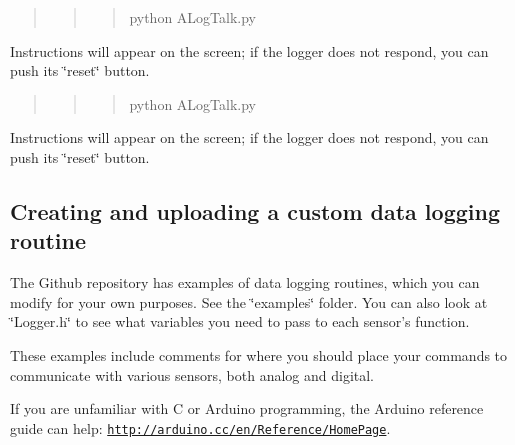 \begin{quote}
\begin{quote}
\begin{quote}
python A\+Log\+Talk.\+py \end{quote}
\end{quote}
\end{quote}


Instructions will appear on the screen; if the logger does not respond, you can push its \char`\"{}reset\char`\"{} button.

\begin{quote}
\begin{quote}
\begin{quote}
python A\+Log\+Talk.\+py \end{quote}
\end{quote}
\end{quote}


Instructions will appear on the screen; if the logger does not respond, you can push its \char`\"{}reset\char`\"{} button.\hypertarget{index_programming_your_own}{}\subsection{Creating and uploading a custom data logging routine}\label{index_programming_your_own}
The Github repository has examples of data logging routines, which you can modify for your own purposes. See the \char`\"{}examples\char`\"{} folder. You can also look at \char`\"{}\+Logger.\+h\char`\"{} to see what variables you need to pass to each sensor’s function.

These examples include comments for where you should place your commands to communicate with various sensors, both analog and digital.

If you are unfamiliar with C or Arduino programming, the Arduino reference guide can help\+: \href{http://arduino.cc/en/Reference/HomePage}{\tt http\+://arduino.\+cc/en/\+Reference/\+Home\+Page}.


